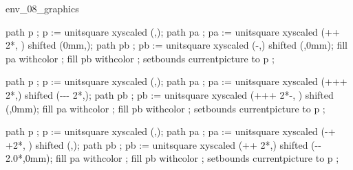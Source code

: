 \startenvironment env_08_graphics


path  p  ;
p :=  unitsquare 
      xyscaled (\overlaywidth,\overlayheight);
path  pa ; 
pa := unitsquare 
      xyscaled (\the\textwidth+\the\rightmarginwidth+
               2*\the\rightmargindistance,
               ) 
      shifted  (0mm,\overlayheight);
path  pb ; 
pb := unitsquare 
      xyscaled (\the\textwidth-,) 
      shifted  (,0mm);
fill  pa withcolor  ;
fill  pb withcolor  ;
setbounds currentpicture to p ;
\stopuseMPgraphic


path  p  ; 
p :=  unitsquare 
      xyscaled (\overlaywidth,\overlayheight);
path  pa ; 
pa := unitsquare  
      xyscaled (\the\textwidth+\the\rightmarginwidth+\the\rightedgewidth+
               2*\the\rightmargindistance,)  
      shifted  (-\the\rightmarginwidth-\the\rightedgewidth-
               2*\the\rightmargindistance,\overlayheight);
path pb ;
pb := unitsquare
      xyscaled (\the\textwidth+\the\rightmarginwidth+\the\rightedgewidth+
               2*\the\rightmargindistance-,
               ) 
      shifted  (,0mm);
fill  pa withcolor  ;
fill  pb withcolor  ;
setbounds currentpicture to p ;
\stopuseMPgraphic



path  p  ; 
p :=  unitsquare 
      xyscaled (\overlaywidth,\overlayheight);
path pa ; 
pa := unitsquare 
      xyscaled (\the\textwidth-+
                \the\rightmarginwidth+2*\the\rightmargindistance,
                ) 
      shifted  (,\overlayheight);
path pb ; 
pb := unitsquare 
      xyscaled (\the\textwidth+\the\rightmarginwidth+
               2*\the\rightmargindistance,) 
      shifted  (-\the\rightmarginwidth-
               2.0*\the\rightmargindistance,0mm);
fill pa withcolor  ;
fill pb withcolor  ;
setbounds currentpicture to p ;
\stopuseMPgraphic

